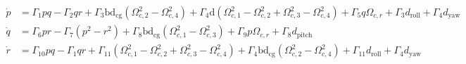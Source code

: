 \documentclass[3p]{elsarticle}
\begin{document}


\begin{align}
    \dot{p} &= \Gamma_1 pq - \Gamma_2 qr + \Gamma_3 \mathrm{b}\mathrm{d}_{\text{cg}} (\Omega_{c, 2}^2 - \Omega_{c, 4}^2) + \Gamma_4 \mathrm{d} (\Omega_{c, 1}^2 - \Omega_{c, 2}^2 + \Omega_{c, 3}^2 - \Omega_{c, 4}^2) + \Gamma_5 q \Omega_{c, r} + \Gamma_3 d_{\text{roll}} + \Gamma_4 d_{\text{yaw}} \\
    \dot{q} &= \Gamma_6 pr - \Gamma_7 (p^2 - r^2) + \Gamma_8  \mathrm{b}\mathrm{d}_{\text{cg}}(\Omega_{c, 1}^2 - \Omega_{c, 3}^2) + \Gamma_9 p \Omega_{c, r} + \Gamma_8 d_{\text{pitch}} \\
    \dot{r} &= \Gamma_{10} pq - \Gamma_{1} qr + \Gamma_{11} (\Omega_{c, 1}^2 - \Omega_{c, 2}^2 + \Omega_{c, 3}^2 - \Omega_{c, 4}^2) + \Gamma_{4}  \mathrm{b}\mathrm{d}_{\text{cg}} (\Omega_{c, 2}^2 - \Omega_{c, 4}^2) + \Gamma_{11} d_{\text{roll}} + \Gamma_{4} d_{\text{yaw}}
\end{align}
\end{document}
